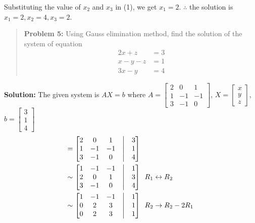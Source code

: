 \documentclass[
  letterpaper,
  DIV=11,
  numbers=noendperiod]{scrreprt}
\begin{document}
Substituting the value of \(x_2\) and \(x_3\) in (1), we get \(x_1=2\).
\(\therefore\) the solution is \(x_1=2, x_2=4, x_3=2\).

\begin{quote}
\textbf{Problem 5:} Using Gauss elimination method, find the solution of
the system of equation \begin{align*}
2x+z &=3\\
x-y-z&=1\\
3x-y &= 4
\end{align*}
\end{quote}

\textbf{Solution:} The given system is \(AX=b\) where
\(A=\begin{bmatrix}
    2 &0 &1\\
    1 &-1 &-1\\
    3 &-1 &0
\end{bmatrix}\), \(X=\begin{bmatrix}
    x\\
    y\\
    z
\end{bmatrix}\), \(b=\begin{bmatrix}
    3\\
    1\\
    4
\end{bmatrix}\) \begin{align*}
    [A|b]&=\begin{bmatrix}
        2 &0  &1 &\bigm| &3\\
        1 &-1 &-1 &\bigm| &1\\
        3 &-1 &0 &\bigm| &4
    \end{bmatrix}\\
    &\sim \begin{bmatrix}
        1 &-1  &-1 &\bigm| &1\\
        2 &0 &1 &\bigm| &3\\
        3 &-1 &0 &\bigm| &4
    \end{bmatrix}\begin{array}{c}
        R_1\leftrightarrow R_2
    \end{array}\\
    &\sim \begin{bmatrix}
        1 &-1  &-1 &\bigm| &1\\
        0 &2 &3 &\bigm| &1\\
        0 &2 &3 &\bigm| &1
    \end{bmatrix}\begin{array}{c}
        R_2\rightarrow R_2-2R_1\\

\end{array}
\end{align*}
\end{document}
